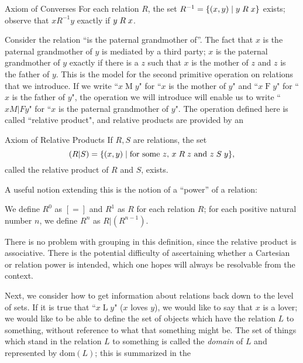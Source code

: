 \begin{axiom}{Axiom of Converses}
 For each relation $R$, the set $R^{-1} = \{(x,y) \mid y \mathrel{R} x\}$
 exists; observe that $x \mathrel{R^{-1}} y$ exactly if $y \mathrel{R} x$.
\end{axiom}

Consider the relation ``is the paternal grandmother
of\hspace{1pt}''.  The
fact that $x$ is the paternal grandmother of $y$ is mediated by a third
party; $x$ is the paternal grandmother of $y$ exactly if there is a $z$ such
that $x$ is the mother of $z$ and $z$ is the father of $y$.  This is the model
for the second primitive operation on relations that we introduce.  If
we write ``$x \mathrel{M} y$" for ``$x$ is the mother of $y$" and ``$x
\mathrel{F} y$" for ``$x$ is the
father of $y$", the operation we will introduce will enable us to write
``$x \mathrel{M|F} y$" for ``$x$ is the paternal grandmother of $y$".  The
operation defined here is called ``relative product", and relative products are
provided by an 

\begin{axiom}{Axiom of Relative Products}
 If $R,S$ are relations, the set
 $$
  (R|S) =
   \{(x,y) \mid \mbox{for some $z$, $x \mathrel{R} z$ and $z \mathrel{S} y$}\},
 $$
 called the
 {\upshape relative product} of $R$ and $S$, exists.
\end{axiom}

A useful notion extending this is the notion of a ``power'' of a relation:

\begin{definition}
  We define $R^0$ as $[=]$ and $R^1$ as $R$ for each relation
  $R$; for each positive natural number $n$, we define
  $R^n$ as $R|(R^{n-1})$.
\end{definition}

There is no problem with grouping in this
definition, since the relative product is associative.  There is the
potential difficulty of ascertaining whether a Cartesian or relation power is intended, which one
hopes will always be resolvable from the context. 

Next, we consider how to get information about relations back
down to the level of sets.  If it is true that ``$x \mathrel{L} y$" ($x$ loves
$y$), 
we would like to say that $x$ is a lover; we would like to be able to
define the set of objects which have the relation $L$ to
something, 
without reference to what that something might be.  The set of things
which stand in the relation $L$ to something is called the {\itshape
domain} of $L$ and represented by dom$(L)$; this is summarized in
the

